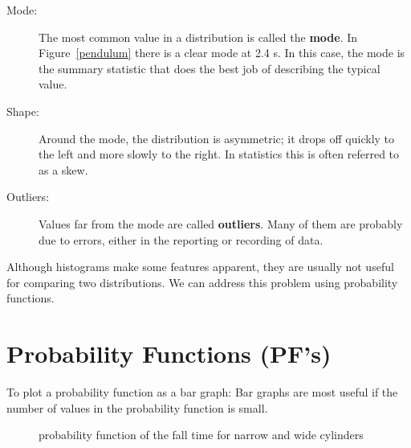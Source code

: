 \begin{description}

\item[Mode:] The most common value in a distribution is called the
  \textbf{mode}.  In Figure~\ref{pendulum} there is a clear mode at 2.4 s.  In this case, the mode is the summary statistic that does
  the best job of describing the typical value.

\item[Shape:] Around the mode, the distribution is asymmetric; it
  drops off quickly to the left and more slowly to the right.  In statistics this is often referred to as a skew. 

\item[Outliers:] Values far from the mode are called \textbf{outliers}.
  Many of them are probably due to errors, either in the reporting
  or recording of data.

\end{description}

Although histograms make some features apparent, they are usually not
useful for comparing two distributions.  We can address this problem using probability functions.


\section{Probability Functions (PF's)}


To plot a probability function as a bar graph:  Bar graphs are most useful if the number
of values in the probability function is small.

\begin{figure}[h]
\caption{ \quad probability function of the fall time for narrow and wide cylinders}
\label{narrow_wide_cylinders}
\end{figure}

